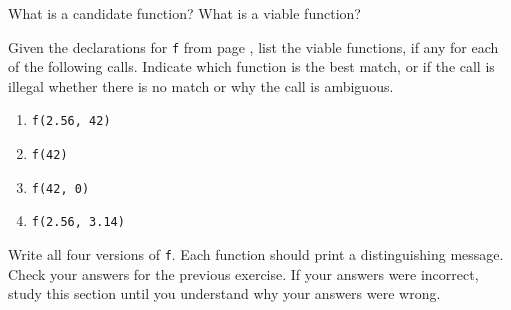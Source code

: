 %
%
\begin{question}
What is a candidate function? What is a viable function?
\end{question}

\begin{question}
Given the declarations for \verb|f| from page \pageref{lst:multiple functions namd f}, list the viable
functions, if any for each of the following calls. Indicate which function is the
best match, or if the call is illegal whether there is no match or why the call
is ambiguous.
\begin{enumerate}[label=(\alph*)]
^^I\item \verb|f(2.56, 42)|
^^I\item \verb|f(42)|
^^I\item \verb|f(42, 0)|
^^I\item \verb|f(2.56, 3.14)|
\end{enumerate}
\end{question}

\begin{question}
Write all four versions of \verb|f|. Each function should print a
distinguishing message. Check your answers for the previous exercise. If your
answers were incorrect, study this section until you understand why your
answers were wrong.
\end{question}
